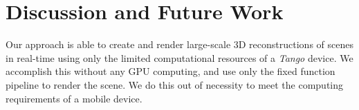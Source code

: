 \documentclass[10pt,twocolumn,letterpaper]{article}
\begin{document}

 
\section{Discussion and Future Work}
Our approach is able to create and render large-scale 3D reconstructions of
scenes in real-time using only the limited computational resources of a
\textit{Tango} device. We accomplish this without any GPU computing, and use
only the fixed function pipeline to render the scene. We do this out of
necessity to meet the computing requirements of a mobile device.
\end{document}
